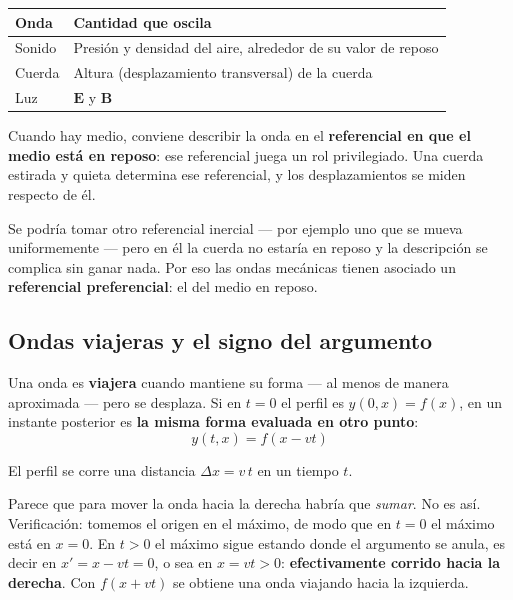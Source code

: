 \documentclass[12pt,a4paper]{article}
\begin{document}
\begin{table}[H]
\centering
\begin{tabular}{ll}
\toprule
\textbf{Onda} & \textbf{Cantidad que oscila} \\
\midrule
Sonido  & Presión y densidad del aire, alrededor de su valor de reposo \\
Cuerda  & Altura (desplazamiento transversal) de la cuerda \\
Luz     & $\mathbf{E}$ y $\mathbf{B}$ \\
\bottomrule
\end{tabular}
\end{table}

Cuando hay medio, conviene describir la onda en el \textbf{referencial en que
el medio está en reposo}: ese referencial juega un rol privilegiado. Una
cuerda estirada y quieta determina ese referencial, y los desplazamientos se
miden respecto de él.

\begin{notebox}
Se podría tomar otro referencial inercial --- por ejemplo uno que se mueva
uniformemente --- pero en él la cuerda no estaría en reposo y la descripción
se complica sin ganar nada. Por eso las ondas mecánicas tienen asociado un
\textbf{referencial preferencial}: el del medio en reposo.
\end{notebox}

\subsection{Ondas viajeras y el signo del argumento}

Una onda es \textbf{viajera} cuando mantiene su forma --- al menos de manera
aproximada --- pero se desplaza. Si en $t = 0$ el perfil es $y(0,x) = f(x)$,
en un instante posterior es \textbf{la misma forma evaluada en otro punto}:
\[
\boxed{\ y(t,x) = f(x - vt)\ }
\]

El perfil se corre una distancia $\Delta x = v\,t$ en un tiempo $t$.

\begin{warnbox}
Parece que para mover la onda hacia la derecha habría que \emph{sumar}. No es
así. Verificación: tomemos el origen en el máximo, de modo que en $t = 0$ el
máximo está en $x = 0$. En $t > 0$ el máximo sigue estando donde el argumento
se anula, es decir en $x' = x - vt = 0$, o sea en $x = vt > 0$:
\textbf{efectivamente corrido hacia la derecha}. Con $f(x + vt)$ se obtiene
una onda viajando hacia la izquierda.
\end{warnbox}
\end{document}
